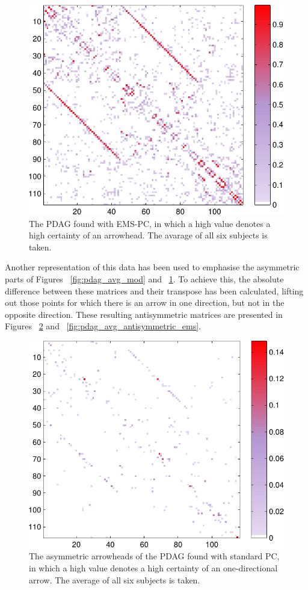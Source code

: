 \documentclass[a4paper, 10pt, english, onecolumn]{article}
\begin{document}
\begin{figure}[h!]
  \centering
  \includegraphics{images/PDAG_avg_colored_expl}
  \caption{The PDAG found with EMS-PC, in which a high value denotes a high certainty of an arrowhead. The avarage of all six subjects is taken.}
  \label{fig:pdag_avg_ems}
\end{figure}

Another representation of this data has been used to emphasise the asymmetric parts of Figures ~\ref{fig:pdag_avg_mod} and ~\ref{fig:pdag_avg_ems}.
To achieve this, the absolute difference between these matrices and their transpose has been calculated, lifting out those points for which there is an arrow in one direction, but not in the opposite direction.
These resulting antisymmetric matrices are presented in Figures ~\ref{fig:pdag_avg_antisymmetric_mod} and ~\ref{fig:pdag_avg_antisymmetric_ems}.

\begin{figure}[h!]
  \centering
  \includegraphics{images/arrowheads_avg_mod}
  \caption{The asymmetric arrowheads of the PDAG found with standard PC, in which a high value denotes a high certainty of an one-directional arrow. The average of all six subjects is taken.}
  \label{fig:pdag_avg_antisymmetric_mod}
\end{figure}
\end{document}
